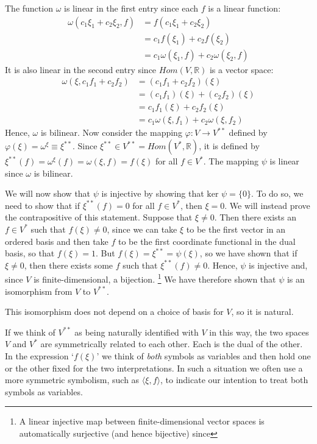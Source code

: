 \documentclass[12pt,letterpaper,reqno]{article}
\numberwithin{equation}{section}
\newcommand{\ti}[1]{\textit{#1}}
\newcommand{\fixme}[1]{{\color{orange}{[#1]}}}
\begin{document}
\begin{pf}
The function $\omega$ is linear in the first entry since each $f$ is a linear function:
\begin{align*}
\omega(c_1\xi_1+c_2\xi_2,f)&=f(c_1\xi_1+c_2\xi_2)\\
&=c_1f(\xi_1)+c_2f(\xi_2) \\
&=c_1\omega(\xi_1,f)+c_2\omega(\xi_2,f)
\end{align*}
It is also linear in the second entry since $Hom(V,\mathbb{R})$ is a vector space:
\begin{align*}
	\omega(\xi,c_1f_1+c_2f_2)&=(c_1f_1+c_2f_2) (\xi) \\
	&=(c_1f_1)(\xi)+(c_2f_2)(\xi) \\
	&=c_1f_1(\xi)+c_2f_2(\xi) \\
	&=c_1\omega(\xi,f_1)+c_2\omega(\xi,f_2)
\end{align*}
Hence, $\omega$ is bilinear. Now consider the mapping $\varphi:V \to V^{**}$ defined by $\varphi(\xi)=\omega^\xi\equiv \xi^{**}$. Since $\xi^{**}\in V^{**}=Hom(V^*,\mathbb{R})$, it is defined by $\xi^{**}(f)=\omega^\xi(f)=\omega(\xi,f)=f(\xi)$ for all $f \in V^*$. The mapping $\psi$ is linear since $\omega$ is bilinear.

We will now show that $\psi$ is injective by showing that $\text{ker }\psi=\{0\}$. To do so, we need to show that if $\xi^{**}(f)=0$ for all $f \in V^*$, then $\xi=0$. We will instead prove the contrapositive of this statement. Suppose that $\xi \neq 0$. Then there exists an $f \in V^*$ such that $f(\xi) \neq 0$, since we can take $\xi$ to be the first vector in an ordered basis and then take $f$ to be the first coordinate functional in the dual basis, so that $f(\xi)=1$. But $f(\xi)=\xi^{**}=\psi(\xi)$, so we have shown that if $\xi \neq 0$, then there exists some $f$ such that $\xi^{**}(f) \neq 0$. Hence, $\psi$ is injective and, since $V$ is finite-dimensional, a bijection. \footnote{A linear injective map between finite-dimensional vector spaces is automatically surjective (and hence bijective) since \fixme{Finish this. Maybe this needs to come later after discussing the rank of a linear transformation?}} We have therefore shown that $\psi$ is an isomorphism from $V$ to $V^{**}$.

This isomorphism does not depend on a choice of basis for $V$, so it is natural. \fixme{Explain this more precisely.}
\end{pf}

If we think of $V^{**}$ as being naturally identified with $V$ in this way, the two spaces $V$ and $V^*$ are symmetrically related to each other. Each is the dual of the other. In the expression `$f(\xi)$' we think of \ti{both} symbols as variables and then hold one or the other fixed for the two interpretations. In such a situation we often use a more symmetric symbolism, such as $\langle \xi,f\rangle$, to indicate our intention to treat both symbols as variables.
\end{document}
